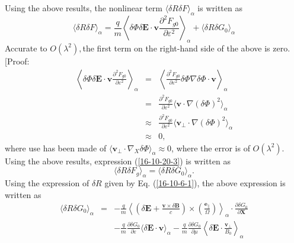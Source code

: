 \documentclass{llncs}
\newcommand{\tmmathbf}[1]{\ensuremath{\boldsymbol{#1}}}
\begin{document}
Using the above results, the nonlinear term $\langle \delta R \delta F
\rangle_{\alpha}$ is written as
\begin{equation}
  \label{16-10-20-3} \langle \delta R \delta F \rangle_{\alpha} = \frac{q}{m}
  \left\langle \delta \Phi \delta \mathbf{E} \cdot \mathbf{v} \frac{\partial^2
  F_{g 0}}{\partial \varepsilon^2} \right\rangle_{\alpha} + \langle \delta R
  \delta G_0 \rangle_{\alpha}
\end{equation}
Accurate to $O (\lambda^2),$the first term on the right-hand side of the above
is zero. [Proof:
\begin{eqnarray}
  \left\langle \delta \Phi \delta \mathbf{E} \cdot \mathbf{v} \frac{\partial^2
  F_{g 0}}{\partial \varepsilon^2} \right\rangle_{\alpha} & = & \left\langle
  \frac{\partial^2 F_{g 0}}{\partial \varepsilon^2} \delta \Phi \nabla \delta
  \Phi \cdot \mathbf{v} \right\rangle_{\alpha} \nonumber\\
  & = & \frac{\partial^2 F_{g 0}}{\partial \varepsilon^2} \langle \mathbf{v}
  \cdot \nabla (\delta \Phi)^2 \rangle_{\alpha} \nonumber\\
  & \approx & \frac{\partial^2 F_{g 0}}{\partial \varepsilon^2} \langle
  \mathbf{v}_{\perp} \cdot \nabla (\delta \Phi)^2 \rangle_{\alpha} \nonumber\\
  & \approx & 0, 
\end{eqnarray}
where use has been made of $\langle \mathbf{v}_{\perp} \cdot \nabla_X \delta
\Phi \rangle_{\alpha} \approx 0$, where the error is of $O (\lambda^2)$. Using
the above results, expression (\ref{16-10-20-3}) is written as
\begin{equation}
  \label{16-10-20-7} \langle \delta R \delta F_g \rangle_{\alpha} = \langle
  \delta R \delta G_0 \rangle_{\alpha} .
\end{equation}
Using the expression of $\delta R$ given by Eq. (\ref{16-10-6-1}), the above
expression is written as
\begin{eqnarray}
  \langle \delta R \delta G_0 \rangle_{\alpha} & = & - \frac{q}{m}
  \left\langle \left( \delta \mathbf{E}+ \frac{\mathbf{v} \times \delta
  \mathbf{B}}{c} \right) \times \left( \frac{\tmmathbf{e}_{\parallel}}{\Omega}
  \right) \right\rangle_{\alpha} \cdot \frac{\partial \delta G_0}{\partial
  \mathbf{X}} \nonumber\\
  &  & - \frac{q}{m}  \frac{\partial \delta G_0}{\partial \varepsilon}
  \langle \delta \mathbf{E} \cdot \mathbf{v} \rangle_{\alpha} - \frac{q}{m} 
  \frac{\partial \delta G_0}{\partial \mu} \left\langle \delta \mathbf{E}
  \cdot \frac{\mathbf{v}_{\perp}}{B_0} \right\rangle_{\alpha} 
  \label{16-10-20-5}
\end{eqnarray}
\end{document}
